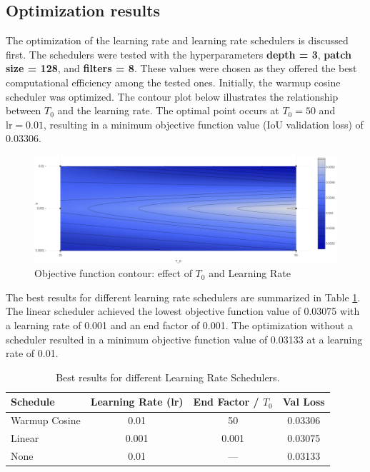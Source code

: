 \subsection{Optimization results}

The optimization of the learning rate and learning rate schedulers is discussed first. The schedulers were tested with the hyperparameters \textbf{depth = 3}, \textbf{patch size = 128}, and \textbf{filters = 8}. These values were chosen as they offered the best computational efficiency among the tested ones. Initially, the warmup cosine scheduler was optimized. The contour plot below illustrates the relationship between \( T_0 \) and the learning rate. The optimal point occurs at \( T_0 = 50 \) and \( \text{lr} = 0.01 \), resulting in a minimum objective function value (IoU validation loss) of 0.03306.

\begin{figure}[H]
    \centering
    \includegraphics[width=0.75\linewidth]{PICTURES/cosine.png}
    \caption{Objective function contour: effect of \( T_0 \) and Learning Rate}
    \label{fig:cosine_contour}
\end{figure}

The best results for different learning rate schedulers are summarized in Table \ref{tab:scheduler_results}. The linear scheduler achieved the lowest objective function value of 0.03075 with a learning rate of 0.001 and an end factor of 0.001. The optimization without a scheduler resulted in a minimum objective function value of 0.03133 at a learning rate of 0.01.

\begin{table}[H]
    \centering
    \begin{tabular}{lccc}
        \toprule
        Schedule & Learning Rate (lr) & End Factor / \( T_0 \) & Val Loss \\
        \midrule
        Warmup Cosine & 0.01 & 50 & 0.03306 \\
        Linear & 0.001 & 0.001 & 0.03075 \\
        None & 0.01 & --- & 0.03133 \\
        \bottomrule
    \end{tabular}
    \caption{Best results for different Learning Rate Schedulers.}
    \label{tab:scheduler_results}
\end{table}

